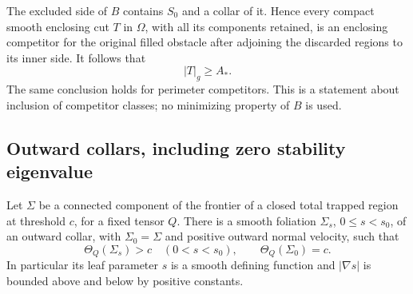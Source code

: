 The excluded side of $B$ contains $S_0$ and a collar of it.  Hence
every compact smooth enclosing cut $T$ in $\Omega$, with all its
components retained, is an enclosing competitor for the original
filled obstacle after adjoining the discarded regions to its inner
side.  It follows that
\begin{equation}\label{n3:domains:inherited-area}
 |T|_g\geq A_*.
\end{equation}
The same conclusion holds for perimeter competitors.  This is a
statement about inclusion of competitor classes; no minimizing
property of $B$ is used.

\subsection{Outward collars, including zero stability eigenvalue}

\begin{lemma}\label{n3:domains:stable-collar}
Let $\Sigma$ be a connected component of the frontier of a closed
total trapped region at threshold $c$, for a fixed tensor $Q$.
There is a smooth foliation $\Sigma_s$, $0\leq s<s_0$, of an outward
collar, with $\Sigma_0=\Sigma$ and positive outward normal velocity,
such that
\begin{equation}\label{n3:domains:collar-expansion}
 \Theta_Q(\Sigma_s)>c\quad(0<s<s_0),\qquad
 \Theta_Q(\Sigma_0)=c.
\end{equation}
In particular its leaf parameter $s$ is a smooth defining function
and $|\nabla s|$ is bounded above and below by positive constants.
\end{lemma}


